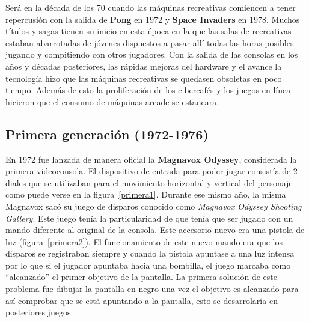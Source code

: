 Ser\'a en la d\'ecada de los 70 cuando las m\'aquinas recreativas comiencen a tener repercusi\'on con la salida de \textbf{Pong} en 1972 y \textbf{Space Invaders} en 1978. Muchos t\'itulos y sagas tienen su inicio en esta \'epoca en la que las salas de recreativas estaban abarrotadas de j\'ovenes dispuestos a pasar all\'i todas las horas posibles jugando y compitiendo con otros jugadores. Con la salida de las consolas en los a\~nos y d\'ecadas posteriores, las r\'apidas mejoras del hardware y el avance la tecnolog\'ia hizo que las m\'aquinas recreativas se quedasen obsoletas en poco tiempo. Adem\'as de esto la proliferaci\'on de los cibercaf\'es y los juegos en l\'inea hicieron que el consumo de m\'aquinas arcade se estancara. \\

\subsection{Primera generaci\'on (1972-1976)}


En 1972 fue lanzada de manera oficial la \textbf{Magnavox Odyssey}, considerada la primera videoconsola. El dispositivo de entrada para poder jugar consist\'ia de 2 diales que se utilizaban para el movimiento horizontal y vertical del personaje como puede verse en la figura~\ref{primera1}. Durante ese mismo a\~no, la misma Magnavox sac\'o su juego de disparos conocido como \textit{Magnavox Odyssey Shooting Gallery}. Este juego ten\'ia la particularidad de que ten\'ia que ser jugado con un mando diferente al original de la consola. Este accesorio nuevo era una pistola de luz (figura~\ref{primera2}). El funcionamiento de este nuevo mando era que los disparos se registraban siempre y cuando la pistola apuntase a una luz intensa por lo que si el jugador apuntaba hacia una bombilla, el juego marcaba como ``alcanzado'' el primer objetivo de la pantalla. La primera soluci\'on de este problema fue dibujar la pantalla en negro una vez el objetivo es alcanzado para as\'i comprobar que se est\'a apuntando a la pantalla, esto se desarrolar\'ia en posteriores juegos. \\

